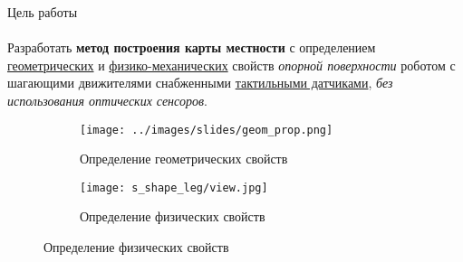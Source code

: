 \begin{frame}[t]{Цель работы}
    \framesubtitle{}
    Разработать \textbf{метод построения карты местности} с определением \underline{геометрических} и \underline{физико-механических} свойств \textit{опорной поверхности} роботом с шагающими движителями снабженными \underline{тактильными датчиками}, \textit{без использования оптических сенсоров}.
    \begin{figure}[H]
        \begin{subfigure}{0.49\textwidth}
            \centering\texttt{[image: ../images/slides/geom\_prop.png]}
            \caption*{Определение геометрических свойств}
        \end{subfigure}
        \begin{subfigure}{0.49\textwidth}
            \centering\texttt{[image: s\_shape\_leg/view.jpg]}
            \caption*{Определение физических свойств}
        \end{subfigure}
    \end{figure}
\end{frame}


